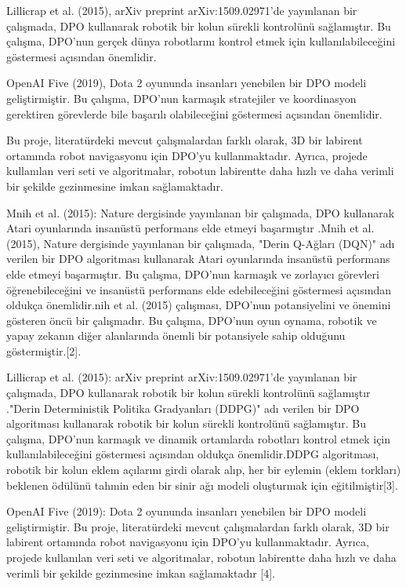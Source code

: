 \documentclass[12pt, a4paper]{article}
\begin{document}
Lillicrap et al. (2015), arXiv preprint arXiv:1509.02971'de yayınlanan bir çalışmada, DPO kullanarak robotik bir kolun sürekli kontrolünü sağlamıştır. Bu çalışma, DPO'nun gerçek dünya robotlarını kontrol etmek için kullanılabileceğini göstermesi açısından önemlidir.

OpenAI Five (2019), Dota 2 oyununda insanları yenebilen bir DPO modeli geliştirmiştir. Bu çalışma, DPO'nun karmaşık stratejiler ve koordinasyon gerektiren görevlerde bile başarılı olabileceğini göstermesi açısından önemlidir.

Bu proje, literatürdeki mevcut çalışmalardan farklı olarak, 3D bir labirent ortamında robot navigasyonu için DPO'yu kullanmaktadır. Ayrıca, projede kullanılan veri seti ve algoritmalar, robotun labirentte daha hızlı ve daha verimli bir şekilde gezinmesine imkan sağlamaktadır.

Mnih et al. (2015): Nature dergisinde yayınlanan bir çalışmada, DPO kullanarak Atari oyunlarında insanüstü performans elde etmeyi başarmıştır .Mnih et al. (2015), Nature dergisinde yayınlanan bir çalışmada, "Derin Q-Ağları (DQN)" adı verilen bir DPO algoritması kullanarak Atari oyunlarında insanüstü performans elde etmeyi başarmıştır. Bu çalışma, DPO'nun karmaşık ve zorlayıcı görevleri öğrenebileceğini ve insanüstü performans elde edebileceğini göstermesi açısından oldukça önemlidir.nih et al. (2015) çalışması, DPO'nun potansiyelini ve önemini gösteren öncü bir çalışmadır. Bu çalışma, DPO'nun oyun oynama, robotik ve yapay zekanın diğer alanlarında önemli bir potansiyele sahip olduğunu göstermiştir.[2].

Lillicrap et al. (2015): arXiv preprint arXiv:1509.02971'de yayınlanan bir çalışmada, DPO kullanarak robotik bir kolun sürekli kontrolünü sağlamıştır ."Derin Deterministik Politika Gradyanları (DDPG)" adı verilen bir DPO algoritması kullanarak robotik bir kolun sürekli kontrolünü sağlamıştır. Bu çalışma, DPO'nun karmaşık ve dinamik ortamlarda robotları kontrol etmek için kullanılabileceğini göstermesi açısından oldukça önemlidir.DDPG algoritması, robotik bir kolun eklem açılarını girdi olarak alıp, her bir eylemin (eklem torkları) beklenen ödülünü tahmin eden bir sinir ağı modeli oluşturmak için eğitilmiştir[3].

OpenAI Five (2019): Dota 2 oyununda insanları yenebilen bir DPO modeli geliştirmiştir.
Bu proje, literatürdeki mevcut çalışmalardan farklı olarak, 3D bir labirent ortamında robot navigasyonu için DPO'yu kullanmaktadır. Ayrıca, projede kullanılan veri seti ve algoritmalar, robotun labirentte daha hızlı ve daha verimli bir şekilde gezinmesine imkan sağlamaktadır [4].
\end{document}
